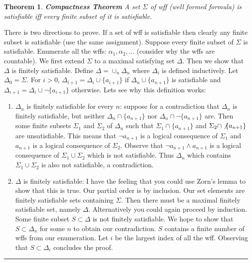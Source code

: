 \documentclass[twoside]{article}
\newcounter{lecnum}
\newtheorem{theorem}{Theorem}[lecnum]
\newenvironment{proof}{{\bf Proof:}}{\hfill\rule{2mm}{2mm}}
\begin{document}
\begin{theorem}
\textbf{Compactness Theorem} A set $\Sigma$ of wff (well formed formula) is satisfiable iff every finite subset of it is satisfiable. 
\end{theorem}
\begin{proof}	
There is two directions to prove. If a set of wff is satisfiable then clearly any finite subset is satisfiable (use the same assignment). Suppose every finite subset of $\Sigma$ is satisfiable. Enumerate all the wffs: $\alpha_1, \alpha_2, ...$ (consider why the wffs are countable). We first extend $\Sigma$ to a maximal satisfying set $\Delta$. Then we show that $\Delta$ is finitely satisfiable. Define $\Delta = \cup_n \Delta_n$ where $\Delta_i$ is defined inductively. Let $\Delta_0 = \Sigma$. For $i > 0$, $\Delta_{i+1} = \Delta_{i} \cup \{a_{i+1}\}$ if $\Delta_n \cup \{a_{n+1}\}$ is satisfiable and $\Delta_{i+1} = \Delta_{i} \cup \lnot \{a_{i+1}\}$ otherwise. Lets see why this definition works:

\begin{enumerate}
\item $\Delta_n$ is finitely satisfiable for every $n$: suppose for a contradiction that $\Delta_n$ is finitely satisfiable, but neither $\Delta_{n}\cap \{a_{n+1}\}$ nor $\Delta_{n} \cap \lnot\{a_{n+1}\}$ are. Then some finite subsets $\Sigma_1$ and $\Sigma_2$ of $\Delta_n$ such that $\Sigma_1 \cap \{a_{n+1}\}$ and $\Sigma_2 \cap \not\{a_{n+1}\}$ are unsatisfiable. This means that $\lnot a_{n+1}$ is a logical consequence of $\Sigma_1$ and $a_{n+1}$ is a logical consequence of $\Sigma_2$. Observe that $\lnot a_{n+1} \land a_{n+1}$ is a logical consequence of $\Sigma_1 \cup \Sigma_2$ which is not satisfiable. Thus $\Delta_n$ which contains $\Sigma_1 \cup \Sigma_2$ is also not satisfiable, a contradiction.
\item $\Delta$ is finitely satisfiable: I have the feeling that you could use Zorn's lemma to show that this is true. Our partial order is by inclusion. Our set elements are finitely satisfiable sets containing $\Sigma$. Then there must be a maximal finitely satisfiable set, namely $\Delta$. Alternatively you could again proceed by induction. Some finite subset $S \subset \Delta$ is not finitely satisfiable. We hope to show that $S \subset \Delta_n$ for some $n$ to obtain our contradiction. $S$ contains a finite number of wffs from our enumeration. Let $i$ be the largest index of all the wff. Observing that $S \subset \Delta_i$ concludes the proof.    
\end{enumerate}  


\end{proof}
\end{document}
